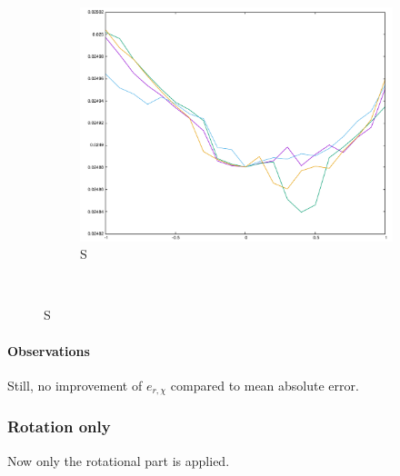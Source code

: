 \begin{figure}[H]
\begin{subfigure}{.33\textwidth}
	\includegraphics[width=\linewidth]{fig/ajherr/t3tr/S_mae.pdf}
	\caption{S}
\end{subfigure}\\
\end{figure}

\paragraph{Observations} Still, no improvement of $e_{r,\chi}$ compared to mean absolute error.



\subsubsection{Rotation only}
Now only the rotational part is applied.


